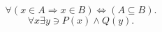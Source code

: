 \documentclass[12pt, a4paper]{article}
\begin{document}
	\[\forall (x \in A\Rightarrow x \in B) \Leftrightarrow (A \subseteq B). \]
	\[\forall x \exists y \ni P(x) \wedge Q(y).\]
\end{document}

